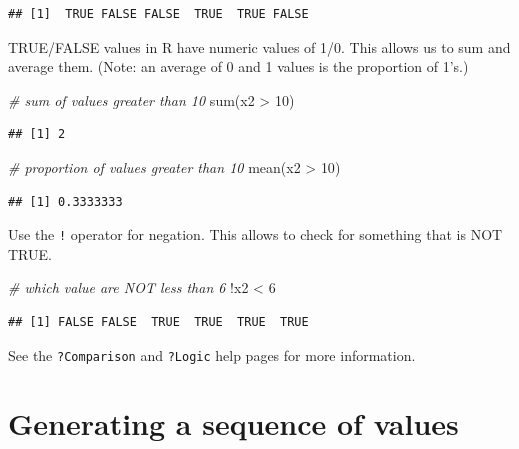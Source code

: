 \documentclass[
]{book}
\newenvironment{Shaded}{\begin{snugshade}}{\end{snugshade}}
\newcommand{\CommentTok}[1]{\textcolor[rgb]{0.56,0.35,0.01}{\textit{#1}}}
\newcommand{\DecValTok}[1]{\textcolor[rgb]{0.00,0.00,0.81}{#1}}
\newcommand{\FunctionTok}[1]{\textcolor[rgb]{0.00,0.00,0.00}{#1}}
\newcommand{\NormalTok}[1]{#1}
\newcommand{\SpecialCharTok}[1]{\textcolor[rgb]{0.00,0.00,0.00}{#1}}
\begin{document}
\begin{verbatim}
## [1]  TRUE FALSE FALSE  TRUE  TRUE FALSE
\end{verbatim}

TRUE/FALSE values in R have numeric values of 1/0. This allows us to sum and average them. (Note: an average of 0 and 1 values is the proportion of 1's.)

\begin{Shaded}
\begin{Highlighting}[]
\CommentTok{\# sum of values greater than 10}
\FunctionTok{sum}\NormalTok{(x2 }\SpecialCharTok{\textgreater{}} \DecValTok{10}\NormalTok{)}
\end{Highlighting}
\end{Shaded}

\begin{verbatim}
## [1] 2
\end{verbatim}

\begin{Shaded}
\begin{Highlighting}[]
\CommentTok{\# proportion of values greater than 10}
\FunctionTok{mean}\NormalTok{(x2 }\SpecialCharTok{\textgreater{}} \DecValTok{10}\NormalTok{)}
\end{Highlighting}
\end{Shaded}

\begin{verbatim}
## [1] 0.3333333
\end{verbatim}

Use the \texttt{!} operator for negation. This allows to check for something that is NOT TRUE.

\begin{Shaded}
\begin{Highlighting}[]
\CommentTok{\# which value are NOT less than 6}
\SpecialCharTok{!}\NormalTok{x2 }\SpecialCharTok{\textless{}} \DecValTok{6}
\end{Highlighting}
\end{Shaded}

\begin{verbatim}
## [1] FALSE FALSE  TRUE  TRUE  TRUE  TRUE
\end{verbatim}

See the \texttt{?Comparison} and \texttt{?Logic} help pages for more information.

\hypertarget{generating-a-sequence-of-values}{%
\section{Generating a sequence of values}\label{generating-a-sequence-of-values}}
\end{document}
